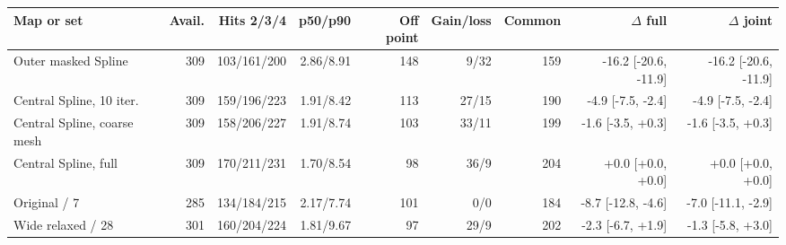 \begin{tabular}{@{}lrrrrrrrr@{}}
\toprule
Map or set & Avail. & Hits 2/3/4 & p50/p90 & Off point & Gain/loss & Common & $\Delta$ full & $\Delta$ joint \\
\midrule
Outer masked Spline & 309 & 103/161/200 & 2.86/8.91 & 148 & 9/32 & 159 & -16.2 [-20.6, -11.9] & -16.2 [-20.6, -11.9] \\
Central Spline, 10 iter. & 309 & 159/196/223 & 1.91/8.42 & 113 & 27/15 & 190 & -4.9 [-7.5, -2.4] & -4.9 [-7.5, -2.4] \\
Central Spline, coarse mesh & 309 & 158/206/227 & 1.91/8.74 & 103 & 33/11 & 199 & -1.6 [-3.5, +0.3] & -1.6 [-3.5, +0.3] \\
Central Spline, full & 309 & 170/211/231 & 1.70/8.54 & 98 & 36/9 & 204 & +0.0 [+0.0, +0.0] & +0.0 [+0.0, +0.0] \\
Original / 7 & 285 & 134/184/215 & 2.17/7.74 & 101 & 0/0 & 184 & -8.7 [-12.8, -4.6] & -7.0 [-11.1, -2.9] \\
Wide relaxed / 28 & 301 & 160/204/224 & 1.81/9.67 & 97 & 29/9 & 202 & -2.3 [-6.7, +1.9] & -1.3 [-5.8, +3.0] \\
\bottomrule
\end{tabular}
